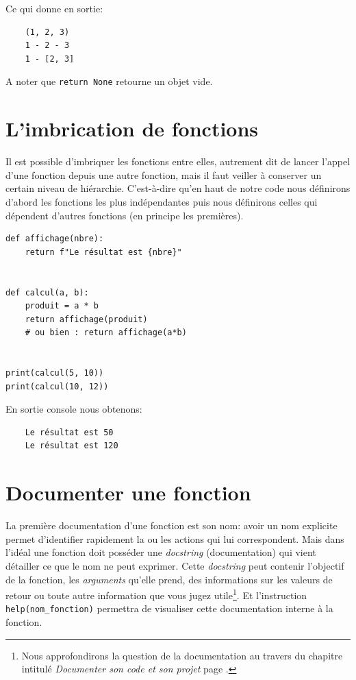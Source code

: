 \documentclass[a4paper,12pt]{book}
\begin{document}
Ce qui donne en sortie:
\begin{verbatim}
    (1, 2, 3)
    1 - 2 - 3
    1 - [2, 3]
\end{verbatim}
\medskip

A noter que \texttt{return None} retourne un objet vide.
\medskip

\section{L'imbrication de fonctions}
Il est possible d'imbriquer les fonctions entre elles, autrement dit de lancer l'appel d'une fonction depuis une autre fonction, mais il faut veiller à conserver un certain niveau de hiérarchie. C'est-à-dire qu'en haut de notre code nous définirons d'abord les fonctions les plus indépendantes puis nous définirons celles qui dépendent d'autres fonctions (en principe les premières).
\begin{lstlisting}[caption=Exemple de fonctions imbriquées]
def affichage(nbre):
    return f"Le résultat est {nbre}"


def calcul(a, b):
    produit = a * b
    return affichage(produit)
    # ou bien : return affichage(a*b)


print(calcul(5, 10))
print(calcul(10, 12))
\end{lstlisting}
\medskip

En sortie console nous obtenons:
\begin{verbatim}
    Le résultat est 50
    Le résultat est 120
\end{verbatim}
\medskip

\section{Documenter une fonction}
La première documentation d'une fonction est son nom: avoir un nom explicite permet d'identifier rapidement la ou les actions qui lui correspondent. Mais dans l'idéal une fonction doit posséder une \textit{docstring} (documentation) qui vient détailler ce que le nom ne peut exprimer. Cette \textit{docstring} peut contenir l'objectif de la fonction, les \textit{arguments} qu'elle prend, des informations sur les valeurs de retour ou toute autre information que vous jugez utile\footnote{Nous approfondirons la question de la documentation au travers du chapitre intitulé \textit{Documenter son code et son projet} page \pageref{documentercodeprojet}.}. Et l'instruction \texttt{help(nom\_fonction)} permettra de visualiser cette documentation interne à la fonction. 
\medskip
\end{document}
